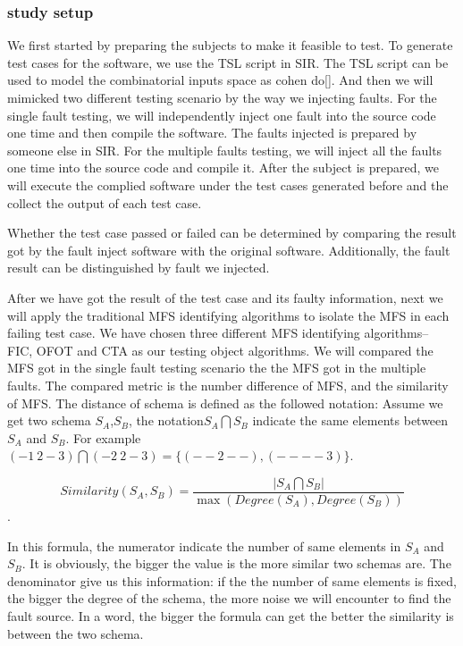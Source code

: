 \documentclass{sig-alternate}
\begin{document}
\subsubsection{study setup}
We first started by preparing the subjects to make it feasible to test. To generate test cases for the software, we use the TSL script in SIR. The TSL script can be used to model the combinatorial inputs space as cohen do[]. And then we will mimicked two different testing scenario by the way we injecting faults. For the single fault testing, we will independently inject one fault into the source code one time and then compile the software.  The faults injected is prepared by someone else in SIR. For the multiple faults testing, we will inject all the faults one time into the source code and compile it.  After the subject is prepared, we will execute the complied software under the test cases generated before and the collect the output of each test case.

Whether the test case passed or failed can be determined by comparing the result got by the fault inject software with the original software. Additionally, the fault result can be distinguished by fault we injected.

After we have got the result of the test case and its faulty information, next we will apply the traditional MFS identifying algorithms to isolate the MFS in each failing test case. We have chosen three different MFS identifying algorithms-- FIC, OFOT and CTA as our testing object algorithms. We will compared the MFS got in the single fault testing scenario the the MFS got in the multiple faults. The compared metric is the number difference of MFS, and the similarity of MFS.  The distance of schema is defined as the followed notation:
Assume we get two schema $S_{A}$,$S_{B}$, the notation$S_{A} \bigcap S_{B}$ indicate the same elements between $S_{A}$ and $S_{B}$. For example $(- 1\ 2 - 3) \bigcap  (- 2\ 2 - 3) = \{ (- - 2 - -) , (- - - - 3)\}$.

\begin{displaymath} Similarity(S_{A},S_{B})= \frac{|S_{A} \bigcap S_{B}|}{\max (Degree(S_{A}),Degree(S_{B})) } \end{displaymath}.

In this formula, the numerator indicate the number of same elements in  $S_{A}$ and $S_{B}$. It is obviously, the bigger the value is the more similar two schemas are.  The denominator give us this information: if the the number of same elements is fixed, the bigger the degree of the schema, the more noise we will encounter to find the fault source. In a word, the bigger the formula can get the better the similarity is between the two schema.
\end{document}
